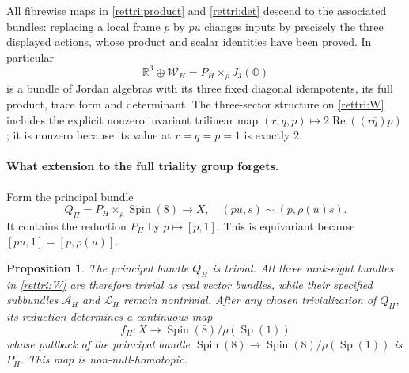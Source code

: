 \documentclass[11pt]{article}
\newtheorem{proposition}[theorem]{Proposition}
\theoremstyle{definition}
\begin{document}
All fibrewise maps in \eqref{rettri:product} and
\eqref{rettri:det} descend to the associated bundles: replacing
a local frame $p$ by $p u$ changes inputs by precisely the three
displayed actions, whose product and scalar identities have been
proved. In particular
\[
 \mathbb R^3\oplus\mathcal W_H
       =P_H\times_\rho J_3(\mathbb O)
\]
is a bundle of Jordan algebras with its three fixed diagonal
idempotents, its full product, trace form and determinant. The
three-sector structure on \eqref{rettri:W} includes the
explicit nonzero invariant trilinear map
$(r,q,p)\mapsto2\operatorname{Re}((r\overline q)p)$;
it is nonzero because its value at $r=q=p=1$ is exactly $2$.

\paragraph{What extension to the full triality group forgets.}
Form the principal bundle
\begin{equation}
 Q_H=P_H\times_\rho\operatorname{Spin}(8)\longrightarrow X,
 \quad (p u,s)\sim(p,\rho(u)s).
 \label{rettri:Q}
\end{equation}
It contains the reduction $P_H$ by $p\mapsto[p,1]$. This is
equivariant because $[p u,1]=[p,\rho(u)]$.

\begin{proposition}
\label{rettri:forgetting}
The principal bundle $Q_H$ is trivial. All three rank-eight
bundles in \eqref{rettri:W} are therefore trivial as real
vector bundles, while their specified subbundles
$\mathcal A_H$ and $\mathcal L_H$ remain nontrivial.
After any chosen trivialization of $Q_H$, its reduction determines
a continuous map
\begin{equation}
 f_H:X\longrightarrow\operatorname{Spin}(8)/\rho(\operatorname{Sp}(1))
 \label{rettri:reductionmap}
\end{equation}
whose pullback of the principal bundle
$\operatorname{Spin}(8)\to\operatorname{Spin}(8)/\rho(\operatorname{Sp}(1))$
is $P_H$. This map is non-null-homotopic.
\end{proposition}
\end{document}

